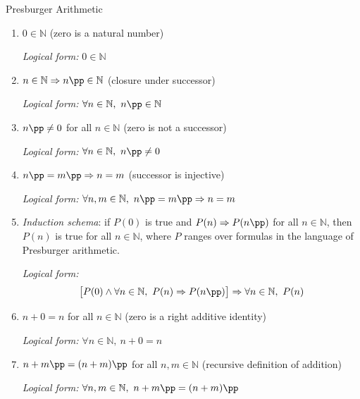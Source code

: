 
\begin{propositionbox}{Presburger Arithmetic}
\begin{enumerate}
  \item[\textbf{Pr1.}] $0 \in \mathbb{N}$
    \quad (zero is a natural number)

    \textit{Logical form:} $0 \in \mathbb{N}$

  \item[\textbf{Pr2.}] $n \in \mathbb{N} \Rightarrow n\pp \in \mathbb{N}$
    \quad (closure under successor)

    \textit{Logical form:} $\forall n \in \mathbb{N},\ n\pp \in \mathbb{N}$

  \item[\textbf{Pr3.}] $n\pp \neq 0$ for all $n \in \mathbb{N}$
    \quad (zero is not a successor)

    \textit{Logical form:} $\forall n \in \mathbb{N},\ n\pp \neq 0$

  \item[\textbf{Pr4.}] $n\pp = m\pp \Rightarrow n = m$
    \quad (successor is injective)

    \textit{Logical form:} $\forall n,m \in \mathbb{N},\ n\pp = m\pp \Rightarrow n = m$

  \item[\textbf{Pr5.}] \emph{Induction schema}: if $P(0)$ is true and
    $P(n) \Rightarrow P(n\pp)$ for all $n \in \mathbb{N}$,
    then $P(n)$ is true for all $n \in \mathbb{N}$,
    where $P$ ranges over formulas in the language of
    Presburger arithmetic.

    \textit{Logical form:}
    \[
    \bigl[P(0) \wedge \forall n \in \mathbb{N},\ P(n) \Rightarrow P(n\pp)\bigr]
    \Rightarrow \forall n \in \mathbb{N},\ P(n)
    \]

  \item[\textbf{Pr6.}] $n + 0 = n$ for all $n \in \mathbb{N}$
    \quad (zero is a right additive identity)

    \textit{Logical form:} $\forall n \in \mathbb{N},\ n + 0 = n$

  \item[\textbf{Pr7.}] $n + m\pp = (n + m)\pp$ for all $n,m \in \mathbb{N}$
    \quad (recursive definition of addition)

    \textit{Logical form:}
    $\forall n,m \in \mathbb{N},\ n + m\pp = (n + m)\pp$
\end{enumerate}
\end{propositionbox}

